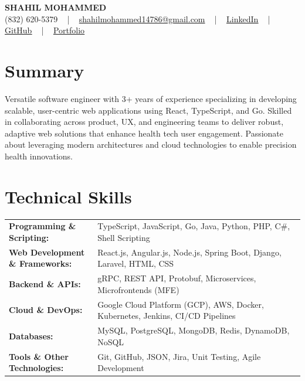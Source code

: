 \documentclass[letterpaper,11pt]{article}
\begin{document}
\begin{center}
    {\fontsize{14pt}{12pt}\selectfont \textbf{\MakeUppercase{Shahil Mohammed}}}\\ \vspace{2pt}
    \fontsize{10pt}{12pt}\selectfont (832) 620-5379 ~ | ~ \href{mailto:shahilmohammed14786@gmail.com}{shahilmohammed14786@gmail.com} ~ | ~  
    \href{https://www.linkedin.com/in/shahil-mohammed-9652931a1/}{\color{blue}\underline{LinkedIn}}  ~ | ~ 
    \href{https://github.com/freakbeast14}{\color{blue}\underline{GitHub}} ~ | ~ 
    \href{https://shahil-mohammed.netlify.app/}{\color{blue}\underline{Portfolio}}
    \vspace{-8pt}
\end{center}

\section{Summary}
\fontsize{9pt}{10pt}\selectfont
Versatile software engineer with 3+ years of experience specializing in developing scalable, user-centric web applications using React, TypeScript, and Go. Skilled in collaborating across product, UX, and engineering teams to deliver robust, adaptive web solutions that enhance health tech user engagement. Passionate about leveraging modern architectures and cloud technologies to enable precision health innovations.
 \vspace{-5pt}
 
\section{Technical Skills}
        \vspace{-14pt}
        \begin{table}[h]
            \fontsize{9pt}{10pt}\selectfont
            \begin{tabular}{p{0.3\linewidth} p{0.7\linewidth}}
                \textbf{Programming \& Scripting:} & TypeScript, JavaScript, Go, Java, Python, PHP, C\#, Shell Scripting \\
                \textbf{Web Development \& Frameworks:} & React.js, Angular.js, Node.js, Spring Boot, Django, Laravel, HTML, CSS \\
                \textbf{Backend \& APIs:} & gRPC, REST API, Protobuf, Microservices, Microfrontends (MFE) \\
                \textbf{Cloud \& DevOps:} & Google Cloud Platform (GCP), AWS, Docker, Kubernetes, Jenkins, CI/CD Pipelines \\
                \textbf{Databases:} & MySQL, PostgreSQL, MongoDB, Redis, DynamoDB, NoSQL \\
                \textbf{Tools \& Other Technologies:} & Git, GitHub, JSON, Jira, Unit Testing, Agile Development \\
            \end{tabular}
        \end{table}
 \vspace{-15pt}
 
\end{document}
